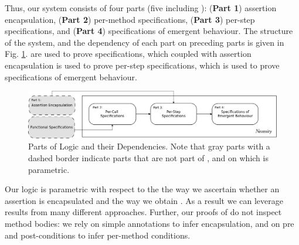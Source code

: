   Thus, our system consists of four parts (five including \funcSpecs):
(\textbf{Part 1}) assertion encapsulation, (\textbf{Part 2}) {per-method} specifications, 
(\textbf{Part 3}) per-step specifications, and (\textbf{Part 4}) specifications of emergent behaviour.
The structure of the system, and the dependency of each part on preceding parts is given in Fig. \ref{fig:dependency}.
 \FuncSpecs are used to prove  specifications, which coupled with 
assertion encapsulation is used to prove per-step specifications, which is used to 
prove specifications of emergent behaviour.
\begin{figure}[t]
\includegraphics[width=\textwidth]{diagrams/dependency.png}
   \caption{
   Parts of \Nec Logic {and their Dependencies}. 
   Note that gray parts with a dashed border indicate
   parts that are not part of \Nec, and on which \Nec 
   is parametric.}

   \label{fig:dependency}
 \end{figure}

Our \Nec logic  is parametric with respect to the 
{the way we ascertain whether an assertion
is encapsulated and the way we obtain \funcSpecs.}
As a result we can leverage  results from many different approaches.
Further, our proofs of \Nec do not inspect method
bodies: we rely on simple annotations to infer encapsulation, and
{on} pre and post-conditions  to infer per-method conditions. 



 


